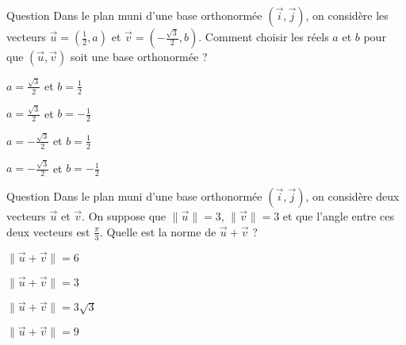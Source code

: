 \begin{multi}[multiple,feedback=
{D'abord, \(\displaystyle \|\vec{u}\|=1\Leftrightarrow a=\frac{\pm \sqrt{3}}{2}\), \(\displaystyle \|\vec{v}\|=1\Leftrightarrow b=\frac{\pm 1}{2}\) et \(\vec{u}\cdot\vec{v}=0\) si, et seulement si, \(a\) et \(b\) sont de même signe.
}]{Question}
Dans le plan muni d'une base orthonormée \((\vec{i},\vec{j})\), on considère les vecteurs \(\displaystyle \vec{u}=\left(\frac{1}{2},a\right)\) et \(\displaystyle \vec{v}=\left(-\frac{\sqrt{3}}{2},b\right)\). Comment choisir les réels \(a\) et \(b\) pour que \((\vec{u},\vec{v})\) soit une base orthonormée ?

    \item* \(\displaystyle a=\frac{\sqrt{3}}{2}\) et \(\displaystyle b=\frac{1}{2}\)
    \item \(\displaystyle a=\frac{\sqrt{3}}{2}\) et \(\displaystyle b=-\frac{1}{2}\)
    \item \(\displaystyle a=-\frac{\sqrt{3}}{2}\) et \(\displaystyle b=\frac{1}{2}\)
    \item* \(\displaystyle a=-\frac{\sqrt{3}}{2}\) et \(\displaystyle b=-\frac{1}{2}\)
\end{multi}


\begin{multi}[multiple,feedback=
{La bilinéarité et la symétrie du produit scalaire donnent
\[\|\vec{u}+\vec{v}\|^2=(\vec{u}+\vec{v})\cdot(\vec{u}+\vec{v})=\|\vec{u}\|^2+\|\vec{v}\|^2+2\vec{u}\cdot\vec{v}.\]
Et puis \(\displaystyle \vec{u}\cdot \vec{v}=\|\vec{u}\|\|\vec{v}\|\cos \left(\frac{\pi}{3}\right)=\frac{9}{2}\). Donc \(\|\vec{u}+\vec{v}\|^2=9+9+9\).
}]{Question}
Dans le plan muni d'une base orthonormée \((\vec{i},\vec{j})\), on considère deux vecteurs \(\displaystyle \vec{u}\) et \(\displaystyle \vec{v}\). On suppose que \(\|\vec{u}\|=3\), \(\|\vec{v}\|=3\) et que l'angle entre ces deux vecteurs est \(\displaystyle \frac{\pi}{3}\). Quelle est la norme de \(\vec{u}+\vec{v}\) ?

    \item \(\displaystyle \|\vec{u}+\vec{v}\|=6\)
    \item \(\displaystyle \|\vec{u}+\vec{v}\|=3\)
    \item* \(\displaystyle \|\vec{u}+\vec{v}\|=3\sqrt{3}\)
    \item \(\displaystyle \|\vec{u}+\vec{v}\|=9\)
\end{multi}


